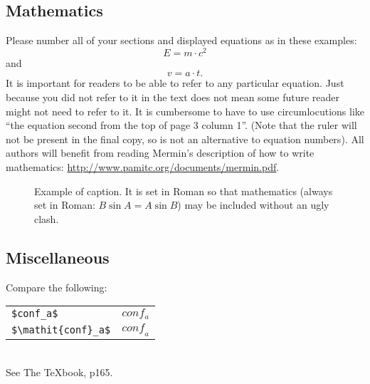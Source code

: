 \documentclass[10pt,twocolumn,letterpaper]{article}
\begin{document}
\subsection{Mathematics}

Please number all of your sections and displayed equations as in these examples:
\begin{equation}
  E = m\cdot c^2
  \label{eq:important}
\end{equation}
and
\begin{equation}
  v = a\cdot t.
  \label{eq:also-important}
\end{equation}
It is important for readers to be able to refer to any particular equation.
Just because you did not refer to it in the text does not mean some future reader might not need to refer to it.
It is cumbersome to have to use circumlocutions like ``the equation second from the top of page 3 column 1''.
(Note that the ruler will not be present in the final copy, so is not an alternative to equation numbers).
All authors will benefit from reading Mermin's description of how to write mathematics:
\url{http://www.pamitc.org/documents/mermin.pdf}.



\begin{figure}[t]
  \centering
  \fbox{\rule{0pt}{2in} \rule{0.9\linewidth}{0pt}}

   \caption{Example of caption.
   It is set in Roman so that mathematics (always set in Roman: $B \sin A = A \sin B$) may be included without an ugly clash.}
   \label{fig:onecol}
\end{figure}

\subsection{Miscellaneous}

\noindent
Compare the following:\\
\begin{tabular}{ll}
 \verb'$conf_a$' &  $conf_a$ \\
 \verb'$\mathit{conf}_a$' & $\mathit{conf}_a$
\end{tabular}\\
See The \TeX book, p165.

\end{document}
